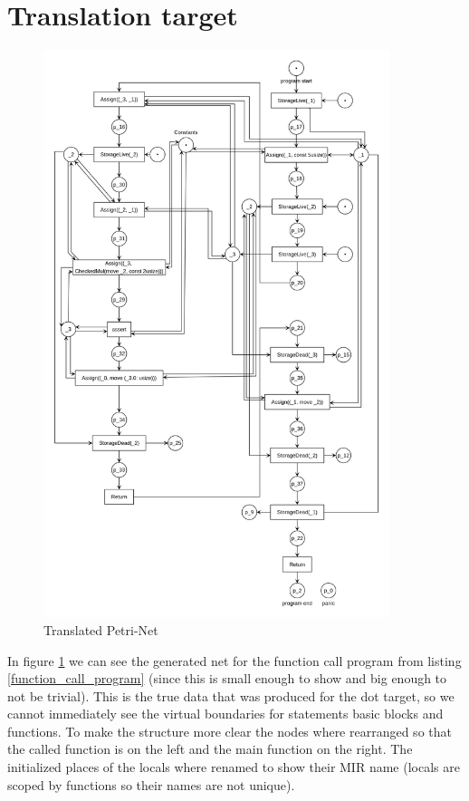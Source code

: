 \section{Translation target}
\begin{figure}
  \centering
  \includegraphics[width=0.9\textwidth]{../diagrams/FunctionCallNet.png}
  \caption{Translated Petri-Net}
  \label{function_call_net}
\end{figure}
In figure \ref{function_call_net} we can see the generated net for the function call program from listing \ref{function_call_program} (since this is small enough to show and big enough to not be trivial).
This is the true data that was produced for the dot target, so we cannot immediately see the virtual boundaries for statements basic blocks and functions.
To make the structure more clear the nodes where rearranged so that the called function is on the left and the main function on the right.
The initialized places of the locals where renamed to show their MIR name (locals are scoped by functions so their names are not unique).

